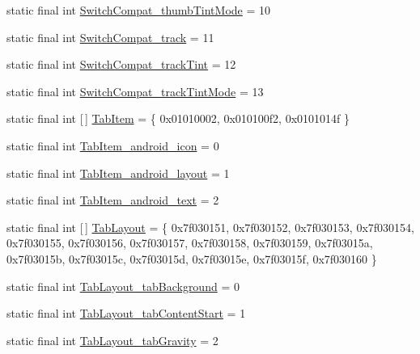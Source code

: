 \begin{DoxyCompactItemize}
\item 
static final int \mbox{\hyperlink{classandroid_1_1support_1_1design_1_1R_1_1styleable_a1483cb687caf6c588813fbc8a3b2fa7e}{Switch\+Compat\+\_\+thumb\+Tint\+Mode}} = 10
\item 
static final int \mbox{\hyperlink{classandroid_1_1support_1_1design_1_1R_1_1styleable_a1257745831bcf4c1a0c1a5c8c393c9b2}{Switch\+Compat\+\_\+track}} = 11
\item 
static final int \mbox{\hyperlink{classandroid_1_1support_1_1design_1_1R_1_1styleable_a654fccb7370c7fa710d8f83343741563}{Switch\+Compat\+\_\+track\+Tint}} = 12
\item 
static final int \mbox{\hyperlink{classandroid_1_1support_1_1design_1_1R_1_1styleable_aed852d48489f6dd787057a9945d1cd2b}{Switch\+Compat\+\_\+track\+Tint\+Mode}} = 13
\item 
static final int \mbox{[}$\,$\mbox{]} \mbox{\hyperlink{classandroid_1_1support_1_1design_1_1R_1_1styleable_a244f187ed8d4ed589f36e6db741d19e8}{Tab\+Item}} = \{ 0x01010002, 0x010100f2, 0x0101014f \}
\item 
static final int \mbox{\hyperlink{classandroid_1_1support_1_1design_1_1R_1_1styleable_a46e96d73ebab77295be1e1a6df14c775}{Tab\+Item\+\_\+android\+\_\+icon}} = 0
\item 
static final int \mbox{\hyperlink{classandroid_1_1support_1_1design_1_1R_1_1styleable_a11150619c6879db4f36afaecf7ae8353}{Tab\+Item\+\_\+android\+\_\+layout}} = 1
\item 
static final int \mbox{\hyperlink{classandroid_1_1support_1_1design_1_1R_1_1styleable_a4c370f3b8f02d1e75f784cff6dfbcd35}{Tab\+Item\+\_\+android\+\_\+text}} = 2
\item 
static final int \mbox{[}$\,$\mbox{]} \mbox{\hyperlink{classandroid_1_1support_1_1design_1_1R_1_1styleable_a514b47b47f600f9421b65f4f0aa832d6}{Tab\+Layout}} = \{ 0x7f030151, 0x7f030152, 0x7f030153, 0x7f030154, 0x7f030155, 0x7f030156, 0x7f030157, 0x7f030158, 0x7f030159, 0x7f03015a, 0x7f03015b, 0x7f03015c, 0x7f03015d, 0x7f03015e, 0x7f03015f, 0x7f030160 \}
\item 
static final int \mbox{\hyperlink{classandroid_1_1support_1_1design_1_1R_1_1styleable_a820be00d91c860d611f8d23069a85668}{Tab\+Layout\+\_\+tab\+Background}} = 0
\item 
static final int \mbox{\hyperlink{classandroid_1_1support_1_1design_1_1R_1_1styleable_a5b71a6c0e3a9a65823285cd0c3ab9e41}{Tab\+Layout\+\_\+tab\+Content\+Start}} = 1
\item 
static final int \mbox{\hyperlink{classandroid_1_1support_1_1design_1_1R_1_1styleable_a7ae8ebe621a45d0943d8ab3dce402abc}{Tab\+Layout\+\_\+tab\+Gravity}} = 2

\end{DoxyCompactItemize}
